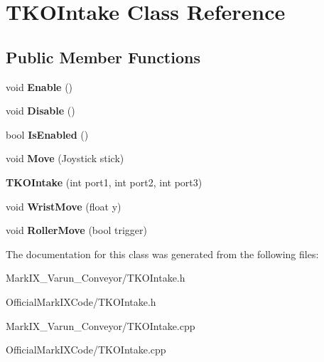 \hypertarget{class_t_k_o_intake}{\section{T\-K\-O\-Intake Class Reference}
\label{class_t_k_o_intake}
}
\subsection*{Public Member Functions}
\begin{DoxyCompactItemize}
\item 
\hypertarget{class_t_k_o_intake_a00c306eca2dcc937cb0a331d46fae74e}{void {\bfseries Enable} ()}\label{class_t_k_o_intake_a00c306eca2dcc937cb0a331d46fae74e}

\item 
\hypertarget{class_t_k_o_intake_ab7c90bf84e87ad084a01159e2cb347fe}{void {\bfseries Disable} ()}\label{class_t_k_o_intake_ab7c90bf84e87ad084a01159e2cb347fe}

\item 
\hypertarget{class_t_k_o_intake_a69f52e997d2818e07f3c5615b0b60595}{bool {\bfseries Is\-Enabled} ()}\label{class_t_k_o_intake_a69f52e997d2818e07f3c5615b0b60595}

\item 
\hypertarget{class_t_k_o_intake_abe2ae466321b6b498645e9c4c7c74528}{void {\bfseries Move} (Joystick stick)}\label{class_t_k_o_intake_abe2ae466321b6b498645e9c4c7c74528}

\item 
\hypertarget{class_t_k_o_intake_a94583d666a5464c20a514712215cfe85}{{\bfseries T\-K\-O\-Intake} (int port1, int port2, int port3)}\label{class_t_k_o_intake_a94583d666a5464c20a514712215cfe85}

\item 
\hypertarget{class_t_k_o_intake_a93c2dd53a27735bd9d3cbfa25139c79f}{void {\bfseries Wrist\-Move} (float y)}\label{class_t_k_o_intake_a93c2dd53a27735bd9d3cbfa25139c79f}

\item 
\hypertarget{class_t_k_o_intake_aea6c16e3049d897c0a5ec60c5da3b52a}{void {\bfseries Roller\-Move} (bool trigger)}\label{class_t_k_o_intake_aea6c16e3049d897c0a5ec60c5da3b52a}

\end{DoxyCompactItemize}


The documentation for this class was generated from the following files\-:\begin{DoxyCompactItemize}
\item 
Mark\-I\-X\-\_\-\-Varun\-\_\-\-Conveyor/T\-K\-O\-Intake.\-h\item 
Official\-Mark\-I\-X\-Code/T\-K\-O\-Intake.\-h\item 
Mark\-I\-X\-\_\-\-Varun\-\_\-\-Conveyor/T\-K\-O\-Intake.\-cpp\item 
Official\-Mark\-I\-X\-Code/T\-K\-O\-Intake.\-cpp\end{DoxyCompactItemize}
